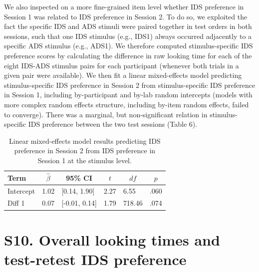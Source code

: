 \documentclass[
  english,
  man, donotrepeattitle,floatsintext]{apa6}
\begin{document}
We also inspected on a more fine-grained item level whether IDS preference in Session 1 was related to IDS preference in Session 2.
To do so, we exploited the fact the specific IDS and ADS stimuli were paired together in test orders in both sessions, such that one IDS stimulus (e.g., IDS1) always occurred adjacently to a specific ADS stimulus (e.g., ADS1).
We therefore computed stimulus-specific IDS preference scores by calculating the difference in raw looking time for each of the eight IDS-ADS stimulus pairs for each participant (whenever both trials in a given pair were available).
We then fit a linear mixed-effects model predicting stimulus-specific IDS preference in Session 2 from stimulus-specific IDS preference in Session 1, including by-participant and by-lab random intercepts (models with more complex random effects structure, including by-item random effects, failed to converge).
There was a marginal, but non-significant relation in stimulus-specific IDS preference between the two test sessions (Table 6).

\begin{table}[tbp]

\begin{center}
\begin{threeparttable}

\caption{\label{tab:unnamed-chunk-37}Linear mixed-effects model results predicting IDS preference in Session 2 from IDS preference in Session 1 at the stimulus level.}

\begin{tabular}{llllll}
\toprule
Term & \multicolumn{1}{c}{$\hat{\beta}$} & \multicolumn{1}{c}{95\% CI} & \multicolumn{1}{c}{$t$} & \multicolumn{1}{c}{$\mathit{df}$} & \multicolumn{1}{c}{$p$}\\
\midrule
Intercept & 1.02 & {}[0.14, 1.90] & 2.27 & 6.55 & .060\\
Diff 1 & 0.07 & {}[-0.01, 0.14] & 1.79 & 718.46 & .074\\
\bottomrule
\end{tabular}

\end{threeparttable}
\end{center}

\end{table}

\hypertarget{s10.-overall-looking-times-and-test-retest-ids-preference}{%
\section{S10. Overall looking times and test-retest IDS preference}\label{s10.-overall-looking-times-and-test-retest-ids-preference}}
\end{document}
